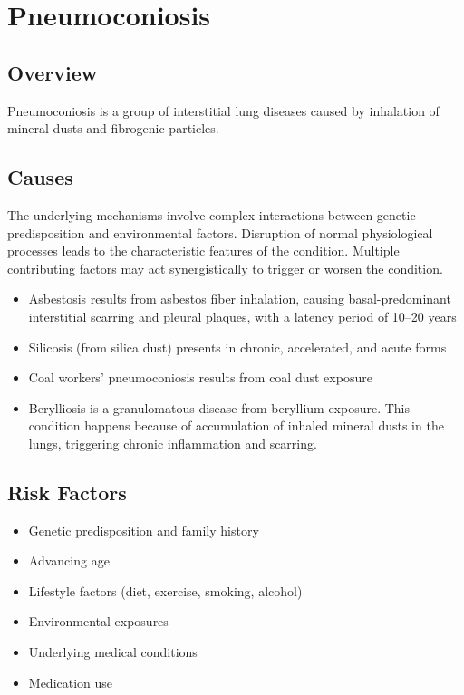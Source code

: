 \chapter{Pneumoconiosis}
\label{sec:Pneumoconiosis}

\section{Overview}
Pneumoconiosis is a group of interstitial lung diseases caused by inhalation of mineral dusts and fibrogenic particles.
\section{Causes}
The underlying mechanisms involve complex interactions between genetic predisposition and environmental factors. Disruption of normal physiological processes leads to the characteristic features of the condition. Multiple contributing factors may act synergistically to trigger or worsen the condition.

\begin{itemize}[noitemsep]
  \item Asbestosis results from asbestos fiber inhalation, causing basal-predominant interstitial scarring and pleural plaques, with a latency period of 10--20 years
  \item Silicosis (from silica dust) presents in chronic, accelerated, and acute forms
  \item Coal workers' pneumoconiosis results from coal dust exposure
  \item Berylliosis is a granulomatous disease from beryllium exposure. This condition happens because of accumulation of inhaled mineral dusts in the lungs, triggering chronic inflammation and scarring.
\end{itemize}
\section{Risk Factors}


\begin{itemize}[noitemsep]
  \item Genetic predisposition and family history
  \item Advancing age
  \item Lifestyle factors (diet, exercise, smoking, alcohol)
  \item Environmental exposures
  \item Underlying medical conditions
  \item Medication use
\end{itemize}
